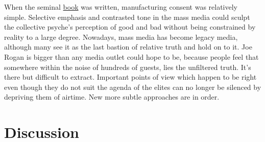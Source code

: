 \documentclass[11pt,a4paper]{article}
\begin{document}
When the seminal \href{https://en.wikipedia.org/wiki/Manufacturing_Consent}{book} was written, manufacturing consent was  relatively simple. Selective emphasis and contrasted tone in the mass media could sculpt the collective psyche's perception of good and bad without being constrained by reality to a large degree. Nowadays, mass media has become legacy media, although many see it as the last bastion of relative truth and hold on to it. Joe Rogan is bigger than any media outlet could hope to be, because people feel that somewhere within the noise of hundreds of guests, lies the unfiltered truth. It's there but difficult to extract. Important points of view which happen to be right even though they do not suit the agenda of the elites can no longer be silenced by depriving them of airtime. New more subtle approaches are in order.

\section*{Discussion}










 
 
\end{document}
